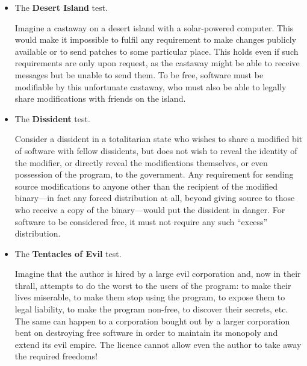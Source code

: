 \documentclass{article}
\begin{document}
\begin{itemize}
\item The {\bf Desert Island} test.

    Imagine a castaway on a desert island with a solar-powered computer. This would make it impossible to fulfil any requirement to make changes publicly available or to send patches to some particular place. This holds even if such requirements are only upon request, as the castaway might be able to receive messages but be unable to send them. To be free, software must be modifiable by this unfortunate castaway, who must also be able to legally share modifications with friends on the island.

\item The {\bf Dissident} test.

    Consider a dissident in a totalitarian state who wishes to share a modified bit of software with fellow dissidents, but does not wish to reveal the identity of the modifier, or directly reveal the modifications themselves, or even possession of the program, to the government. Any requirement for sending source modifications to anyone other than the recipient of the modified binary---in fact any forced distribution at all, beyond giving source to those who receive a copy of the binary---would put the dissident in danger. For software to be considered free, it must not require any such ``excess'' distribution.

\item The {\bf Tentacles of Evil} test.

    Imagine that the author is hired by a large evil corporation and, now in their thrall, attempts to do the worst to the users of the program: to make their lives miserable, to make them stop using the program, to expose them to legal liability, to make the program non-free, to discover their secrets, etc. The same can happen to a corporation bought out by a larger corporation bent on destroying free software in order to maintain its monopoly and extend its evil empire. The licence cannot allow even the author to take away the required freedoms!
\end{itemize}
\end{document}
